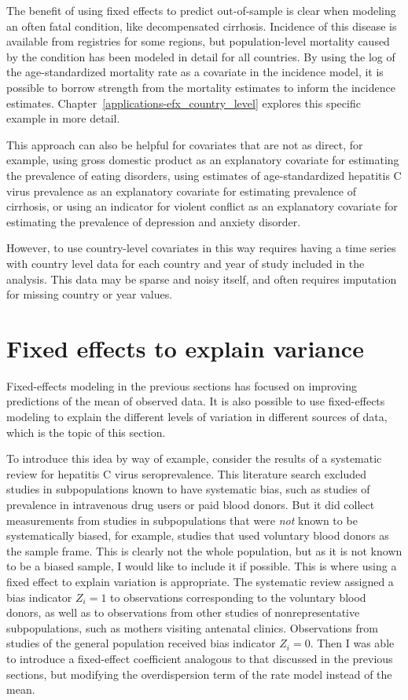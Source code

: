 The benefit of using fixed effects to predict out-of-sample
is clear when modeling an often fatal condition, like
decompensated cirrhosis.  Incidence of this disease is available from
registries for some regions, but population-level mortality caused by
the condition has been modeled in detail for all
countries.\cite{foreman_modeling_2012} By using the log of the
age-standardized mortality rate as a covariate in the incidence model,
it is possible to borrow strength from the mortality estimates to
inform the incidence
estimates. Chapter~\ref{applications-efx_country_level} explores this
specific example in more detail.

This approach can also be helpful for covariates that are not as
direct, for example, using gross domestic product as an explanatory
covariate for estimating the prevalence of eating disorders, using
estimates of age-standardized hepatitis C virus prevalence as an
explanatory covariate for estimating prevalence of cirrhosis, or using
an indicator for violent conflict as an explanatory covariate for
estimating the prevalence of depression and anxiety disorder.

However, to use country-level covariates in this way requires having a
time series with country level data for each country and year of study
included in the analysis. This data may be sparse and noisy itself,
and often requires imputation for missing country or year values.


\section{Fixed effects to explain variance}
Fixed-effects modeling in the previous sections has focused on
improving predictions of the mean of observed data.  It is also
possible to use fixed-effects modeling to explain the
different levels of variation in different sources of data, which is
the topic of this section.

To introduce this idea by way of example, consider the results of a
systematic review for hepatitis C virus seroprevalence.  This
literature search excluded studies in subpopulations known to have
systematic bias, such as studies of prevalence in intravenous drug
users or paid blood donors.  But it did collect measurements from
studies in subpopulations that were \emph{not} known to be
systematically biased, for example, studies that used voluntary blood
donors as the sample frame.  This is clearly not the whole population,
but as it is not known to be a biased sample, I would like to include
it if possible.  This is where using a fixed effect to explain
variation is appropriate. The systematic review assigned
a bias indicator $Z_i = 1$ to observations corresponding to
the voluntary blood donors, as well as to observations from other studies of nonrepresentative
subpopulations, such as mothers visiting antenatal clinics.
Observations from studies of the general
population received bias indicator $Z_i = 0$.  Then I was able to
introduce a fixed-effect coefficient analogous to that discussed in the previous sections,
but modifying the overdispersion term of the rate model instead of
the mean.

